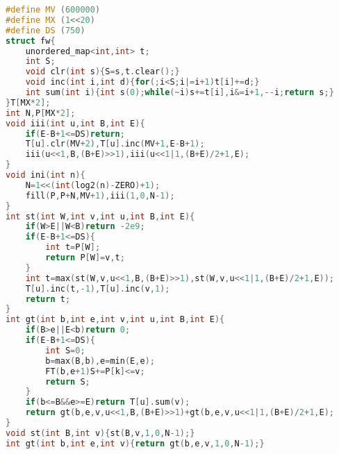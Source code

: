 \documentclass[11pt]{article}
\begin{document}
\begin{lstlisting}[language=C++]
#define MV (600000)
#define MX (1<<20)
#define DS (750)
struct fw{
    unordered_map<int,int> t;
    int S;
    void clr(int s){S=s,t.clear();}
    void inc(int i,int d){for(;i<S;i|=i+1)t[i]+=d;}
    int sum(int i){int s(0);while(~i)s+=t[i],i&=i+1,--i;return s;}
}T[MX*2];
int N,P[MX*2];
void iii(int u,int B,int E){
    if(E-B+1<=DS)return;
    T[u].clr(MV+2),T[u].inc(MV+1,E-B+1);
    iii(u<<1,B,(B+E)>>1),iii(u<<1|1,(B+E)/2+1,E);
}
void ini(int n){
    N=1<<(int(log2(n)-ZERO)+1);
    fill(P,P+N,MV+1),iii(1,0,N-1);
}
int st(int W,int v,int u,int B,int E){
    if(W>E||W<B)return -2e9;
    if(E-B+1<=DS){
        int t=P[W];
        return P[W]=v,t;
    }
    int t=max(st(W,v,u<<1,B,(B+E)>>1),st(W,v,u<<1|1,(B+E)/2+1,E));
    T[u].inc(t,-1),T[u].inc(v,1);
    return t;
}
int gt(int b,int e,int v,int u,int B,int E){
    if(B>e||E<b)return 0;
    if(E-B+1<=DS){
        int S=0;
        b=max(B,b),e=min(E,e);
        FT(b,e+1)S+=P[k]<=v;
        return S;
    }
    if(b<=B&&e>=E)return T[u].sum(v);
    return gt(b,e,v,u<<1,B,(B+E)>>1)+gt(b,e,v,u<<1|1,(B+E)/2+1,E);
}
void st(int B,int v){st(B,v,1,0,N-1);}
int gt(int b,int e,int v){return gt(b,e,v,1,0,N-1);}
\end{lstlisting}
\end{document}
